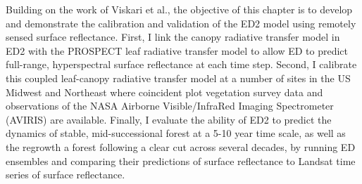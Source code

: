 Building on the work of Viskari et al., the objective of this chapter is to develop and demonstrate the calibration and validation of the ED2 model using remotely sensed surface reflectance.
First, I link the canopy radiative transfer model in ED2 with the PROSPECT leaf radiative transfer model to allow ED to predict full-range, hyperspectral surface reflectance at each time step.
Second, I calibrate this coupled leaf-canopy radiative transfer model at a number of sites in the US Midwest and Northeast where coincident plot vegetation survey data and observations of the NASA Airborne Visible/InfraRed Imaging Spectrometer (AVIRIS) are available.
Finally, I evaluate the ability of ED2 to predict the dynamics of stable, mid-successional forest at a 5-10 year time scale, as well as the regrowth a forest following a clear cut across several decades, by running ED ensembles and comparing their predictions of surface reflectance to Landsat time series of surface reflectance.
